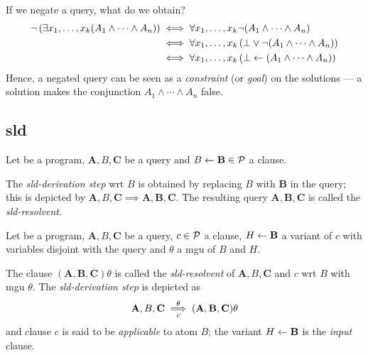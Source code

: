 \begin{rem}
    If we negate a query, what do we obtain?
    \begin{equation*}
        \begin{split}
            \neg\left(\exists{x_1,\dotsc,x_k}(A_1 \land \dotsb \land A_n)\right) &\iff
            \forall{x_1,\dotsc,x_k}\neg(A_1 \land \dotsb \land A_n) \\
            &\iff
            \forall{x_1,\dotsc,x_k}\left(\bot \lor \neg(A_1 \land \dotsb \land A_n)\right) \\
            &\iff
            \forall{x_1,\dotsc,x_k}\left(\bot \leftarrow (A_1 \land \dotsb \land A_n)\right)
        \end{split}
    \end{equation*}
    Hence, a negated query can be seen as a \emph{constraint} (or \emph{goal}) on the solutions --- a solution makes the conjunction \(A_1 \land \dotsb \land A_n\) false.
\end{rem}

\subsection{\gls{sld}}

\begin{dfn}
    Let \prog be a program, \(\mathbf{A}, B, \mathbf{C}\) be a query and \(B \leftarrow \mathbf{B} \in \mathcal{P}\) a clause.
    
    The \emph{\gls{sld}-derivation step} wrt \(B\) is obtained by replacing \(B\) with \(\mathbf{B}\) in the query; this is depicted by \(\mathbf{A}, B, \mathbf{C}\implies \mathbf{A}, \mathbf{B}, \mathbf{C}\).
    The resulting query \(\mathbf{A}, \mathbf{B}, \mathbf{C}\) is called the \emph{\gls{sld}-resolvent}. 
\end{dfn}

\begin{dfn}
    Let \prog be a program, \(\mathbf{A}, B, \mathbf{C}\) be a query, \(c \in \mathcal{P}\) a clause, \(H \leftarrow \mathbf{B}\) a variant of \(c\) with variables disjoint with the query and \(\theta\) a \gls{mgu} of \(B\) and \(H\).
    
    The clause \((\mathbf{A}, \mathbf{B}, \mathbf{C})\theta\) is called the \emph{\gls{sld}-resolvent} of \(\mathbf{A}, B, \mathbf{C}\) and \(c\) wrt \(B\) with \gls{mgu} \(\theta\).
    The \emph{\gls{sld}-derivation step} is depicted as
    \begin{equation*}
        \mathbf{A}, B, \mathbf{C} \underset{c}{\overset{\theta}{\implies}} (\mathbf{A}, \mathbf{B}, \mathbf{C})\theta
    \end{equation*}
    and clause \(c\) is said to be \emph{applicable} to atom \(B\); the variant \(H \leftarrow \mathbf{B}\) is the \emph{input} clause.
\end{dfn}

